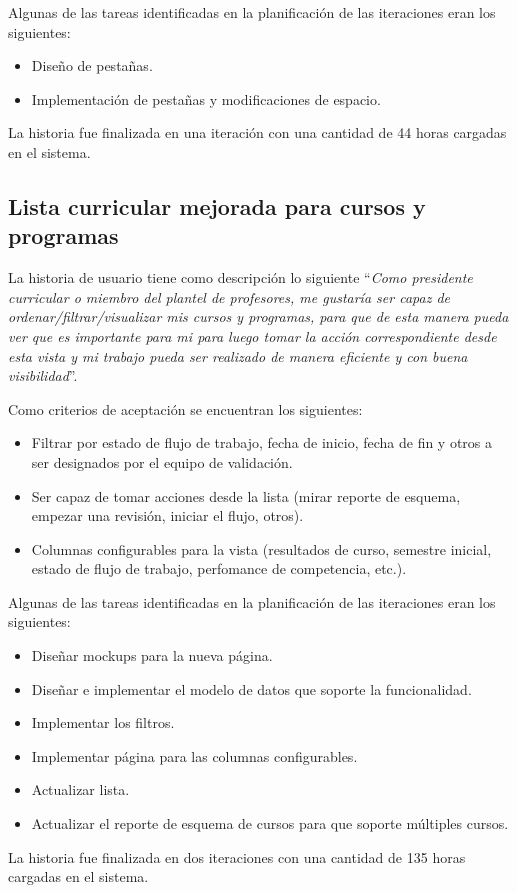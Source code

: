 Algunas de las tareas identificadas en la planificación de las iteraciones eran los siguientes:
\begin{itemize}
	\item Diseño de pestañas.
	\item Implementación de pestañas y modificaciones de espacio.
\end{itemize}

La historia fue finalizada en una iteración con una cantidad de 44 horas cargadas en el sistema.


\subsection{Lista curricular mejorada para cursos y programas}
La historia de usuario tiene como descripción lo siguiente \enquote{\textit{Como presidente curricular o miembro del plantel de profesores, me gustaría ser capaz de ordenar/filtrar/visualizar mis cursos y programas, para que de esta manera pueda ver que es importante para mi para luego tomar la acción correspondiente desde esta vista y mi trabajo pueda ser realizado de manera eficiente y con buena visibilidad}}.

Como criterios de aceptación se encuentran los siguientes:
\begin{itemize}
	\item Filtrar por estado de flujo de trabajo, fecha de inicio, fecha de fin y otros a ser designados por el equipo de validación.
	\item Ser capaz de tomar acciones desde la lista (mirar reporte de esquema, empezar una revisión, iniciar el flujo, otros).
	\item Columnas configurables para la vista (resultados de curso, semestre inicial, estado de flujo de trabajo, perfomance de competencia, etc.).
\end{itemize}

Algunas de las tareas identificadas en la planificación de las iteraciones eran los siguientes:
\begin{itemize}
	\item Diseñar mockups para la nueva página.
	\item Diseñar e implementar el modelo de datos que soporte la funcionalidad.
	\item Implementar los filtros.
	\item Implementar página para las columnas configurables.
	\item Actualizar lista.
	\item Actualizar el reporte de esquema de cursos para que soporte múltiples cursos.
\end{itemize}

La historia fue finalizada en dos iteraciones con una cantidad de 135 horas cargadas en el sistema.